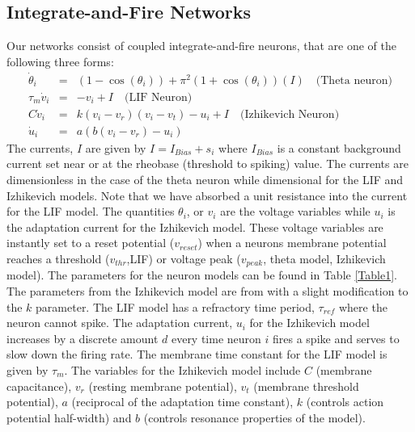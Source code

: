 \documentclass[11pt]{article} %
\begin{document}
\subsection*{Integrate-and-Fire Networks} 
Our networks consist of coupled integrate-and-fire neurons, that are one of the following three forms: 
\begin{eqnarray}
\dot{\theta}_i &=& (1-\cos(\theta_i)) +\pi^2 (1+\cos(\theta_i))( I)  \quad \text{(Theta neuron)}\\
\tau_m\dot{v}_i &=& -v_i + I  \quad \text{(LIF Neuron)} \\
C\dot{v}_i &=& k(v_i-v_r)(v_i-v_t) - u_i +I  \quad \text{(Izhikevich Neuron)} \\
\dot{u}_i &=& a(b(v_i -v_r) - u_i) 
\end{eqnarray}
The currents, $I$ are given by $I=I_{Bias}+ s_i$ where $I_{Bias}$ is a constant background current set near or at the rheobase (threshold to spiking) value.   The currents are dimensionless in the case of the theta neuron while dimensional for the LIF and Izhikevich models.  Note that we have absorbed a unit resistance into the current for the LIF model.   The quantities $\theta_i$, or $v_i$ are the voltage variables while $u_i$ is the adaptation current for the Izhikevich model.  These voltage variables are instantly set to a reset potential ($v_{reset}$) when a neurons membrane potential reaches a threshold ($v_{thr}$,LIF) or voltage peak ($v_{peak}$, theta model, Izhikevich model).  The parameters for the neuron models can be found in Table \ref{Table1}.  The parameters from the Izhikevich model are from \cite{ahmad} with a slight modification to the $k$ parameter.  The LIF model has a refractory time period, $\tau_{ref}$ where the neuron cannot spike.      The adaptation current, $u_i$ for the Izhikevich model increases by a discrete amount $d$ every time neuron $i$ fires a spike and serves to slow down the firing rate.  The membrane time constant for the LIF model is given by $\tau_m$.  The variables for the Izhikevich model include $C$ (membrane capacitance), $v_r$ (resting membrane potential), $v_t$ (membrane threshold potential), $a$ (reciprocal of the adaptation time constant), $k$ (controls action potential half-width) and $b$ (controls resonance properties of the model).  
\end{document}
